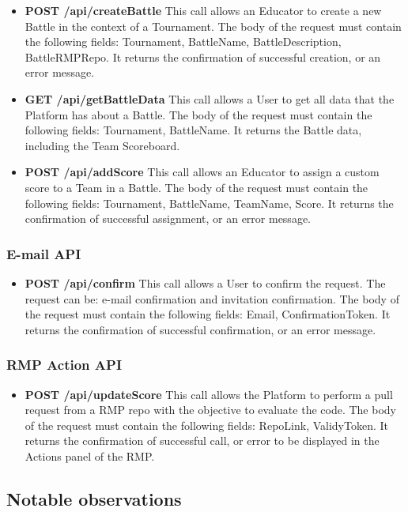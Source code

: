 \begin{itemize}
    \item \textbf{POST /api/createBattle} This call allows an Educator to create a new Battle in the context of a Tournament. The body of the request must contain the following fields: Tournament, BattleName, BattleDescription, BattleRMPRepo. It returns the confirmation of successful creation, or an error message.
    \item \textbf{GET /api/getBattleData} This call allows a User to get all data that the Platform has about a Battle. The body of the request must contain the following fields: Tournament, BattleName. It returns the Battle data, including the Team Scoreboard.
    \item \textbf{POST /api/addScore} This call allows an Educator to assign a custom score to a Team in a Battle. The body of the request must contain the following fields: Tournament, BattleName, TeamName, Score. It returns the confirmation of successful assignment, or an error message.
\end{itemize}

\subsubsection{E-mail API}
\begin{itemize}
    \item \textbf{POST /api/confirm} This call allows a User to confirm the request. The request can be: e-mail confirmation and invitation confirmation. The body of the request must contain the following fields: Email, ConfirmationToken. It returns the confirmation of successful confirmation, or an error message.
\end{itemize}
\subsubsection{RMP Action API}
\begin{itemize}
    \item \textbf{POST /api/updateScore} This call allows the Platform to perform a pull request from a RMP repo with the objective to evaluate the code. The body of the request must contain the following fields: RepoLink, ValidyToken. It returns the confirmation of successful call, or error to be displayed in the Actions panel of the RMP.
\end{itemize}

\subsection{Notable observations}

